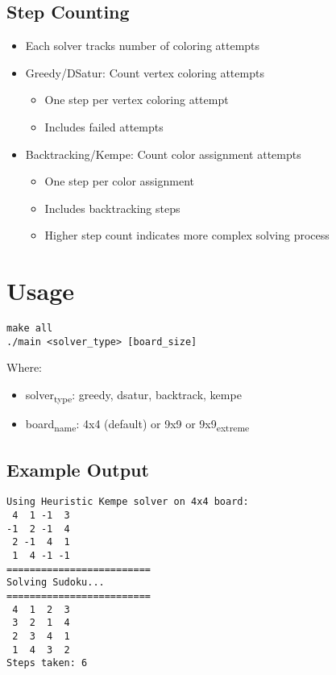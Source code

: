 \documentclass[11pt]{article}
\begin{document}
\subsection{Step Counting}
\label{sec:org0ad7e44}
\begin{itemize}
\item Each solver tracks number of coloring attempts
\item Greedy/DSatur: Count vertex coloring attempts
\begin{itemize}
\item One step per vertex coloring attempt
\item Includes failed attempts
\end{itemize}
\item Backtracking/Kempe: Count color assignment attempts
\begin{itemize}
\item One step per color assignment
\item Includes backtracking steps
\item Higher step count indicates more complex solving process
\end{itemize}
\end{itemize}
\section{Usage}
\label{sec:orgc417aab}
\begin{verbatim}
make all
./main <solver_type> [board_size]
\end{verbatim}

Where:
\begin{itemize}
\item solver\textsubscript{type}: greedy, dsatur, backtrack, kempe
\item board\textsubscript{name}: 4x4 (default) or 9x9 or 9x9\textsubscript{extreme}
\end{itemize}
\subsection{Example Output}
\label{sec:orgd5d5318}
\begin{verbatim}
Using Heuristic Kempe solver on 4x4 board:
 4  1 -1  3 
-1  2 -1  4 
 2 -1  4  1 
 1  4 -1 -1 
=========================
Solving Sudoku...
=========================
 4  1  2  3 
 3  2  1  4 
 2  3  4  1 
 1  4  3  2 
Steps taken: 6
\end{verbatim}
\end{document}
